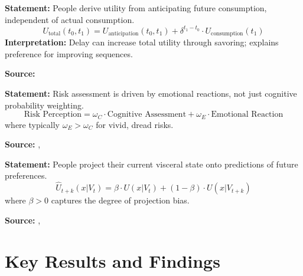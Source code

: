 \begin{tcolorbox}[colback=gray!5!white, colframe=gray!75!black,
    title=Axiom LO-4: Anticipatory Utility]
\textbf{Statement:} People derive utility from anticipating future consumption, independent of actual consumption.
\begin{equation}
U_{\text{total}}(t_0, t_1) = U_{\text{anticipation}}(t_0, t_1) + \delta^{t_1-t_0} \cdot U_{\text{consumption}}(t_1)
\end{equation}
\textbf{Interpretation:} Delay can increase total utility through savoring; explains preference for improving sequences.

\textbf{Source:} \citet{loewenstein1987emotions}
\end{tcolorbox}

\begin{tcolorbox}[colback=gray!5!white, colframe=gray!75!black,
    title=Axiom LO-5: Risk as Feelings]
\textbf{Statement:} Risk assessment is driven by emotional reactions, not just cognitive probability weighting.
\begin{equation}
\text{Risk Perception} = \omega_C \cdot \text{Cognitive Assessment} + \omega_E \cdot \text{Emotional Reaction}
\end{equation}
where typically $\omega_E > \omega_C$ for vivid, dread risks.

\textbf{Source:} \citet{PAP-loewenstein2000emotions}, \citet{loewenstein2001temptation}
\end{tcolorbox}

\begin{tcolorbox}[colback=gray!5!white, colframe=gray!75!black,
    title=Axiom LO-6: Projection Bias]
\textbf{Statement:} People project their current visceral state onto predictions of future preferences.
\begin{equation}
\hat{U}_{t+k}(x | V_t) = \beta \cdot U(x | V_t) + (1-\beta) \cdot U(x | V_{t+k})
\end{equation}
where $\beta > 0$ captures the degree of projection bias.

\textbf{Source:} \citet{loewenstein2000projecting}, \citet{loewenstein2003pain}
\end{tcolorbox}


\section{Key Results and Findings}
\label{sec:lo-results}

